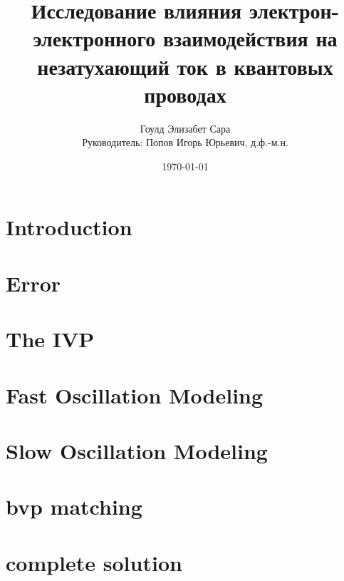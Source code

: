 \documentclass{book}
\renewcommand{\(}{\left(}
\renewcommand{\)}{\right)}
\begin{document}
\title{Исследование влияния электрон-электронного взаимодействия на
незатухающий ток в квантовых проводах}

\author{Гоулд Элизабет Сара\\
Руководитель: Попов Игорь Юрьевич, д.ф.-м.н.
}



 
\date{\today}

\maketitle




\chapter{Introduction}
\chapter{Error}
\chapter{The IVP}
\chapter{Fast Oscillation Modeling}
\chapter{Slow Oscillation Modeling}
\chapter{bvp matching}
\chapter{complete solution}
\end{document}
